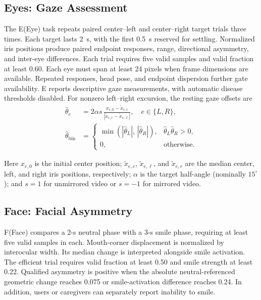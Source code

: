 \documentclass[conference]{IEEEtran}
\providecommand{\revisioncolor}{black}
\DeclareRobustCommand{\revised}[1]{{\color{\revisioncolor}#1}}
\begin{document}
\subsection{Eyes: Gaze Assessment}
The E(Eye) task repeats paired center--left and center--right target trials three
times. Each target lasts 2~s, with the first 0.5~s reserved for settling. Normalized iris
positions produce paired endpoint responses, range, directional asymmetry, and
inter-eye differences. Each trial requires five valid samples and valid fraction at least 0.60. Each eye must span at least 24 pixels when frame dimensions are available. Repeated responses, head pose, and endpoint dispersion further gate availability.
\revised{E reports descriptive gaze measurements, with automatic disease thresholds disabled.}
For nonzero left--right excursion, the resting gaze offsets are
\begin{align}
\hat{\theta}_e&=2\alpha s\,\frac{x_{e,0}-\tilde{x}_{e,c}}{\left|\tilde{x}_{e,r}-\tilde{x}_{e,\ell}\right|},
\quad e\in\{L,R\},\nonumber\\
\hat{\theta}_{\mathrm{bin}}&=
\begin{cases}
\min\!\left(|\hat{\theta}_{L}|,\,|\hat{\theta}_{R}|\right), & \hat{\theta}_{L}\hat{\theta}_{R}>0,\\[2pt]
0, & \text{otherwise}.
\end{cases}
\end{align}

Here $x_{e,0}$ is the initial center position; $\tilde{x}_{e,c}$, $\tilde{x}_{e,\ell}$, and $\tilde{x}_{e,r}$ are the median center, left, and right iris positions, respectively; $\alpha$ is the target half-angle (nominally $15^{\circ}$); and $s=1$ for unmirrored video or $s=-1$ for mirrored video.



\subsection{Face: Facial Asymmetry}
F(Face) compares a 2-s neutral phase with a 3-s smile phase, requiring at least five
valid samples in each. Mouth-corner displacement is normalized
by interocular width. Its median change is interpreted alongside
smile activation. The efficient trial requires valid fraction at least 0.50 and smile
strength at least 0.22. Qualified asymmetry is positive when the absolute
neutral-referenced geometric change reaches 0.075 or smile-activation difference
reaches 0.24. In addition, users or caregivers can separately report inability to smile.
\end{document}
